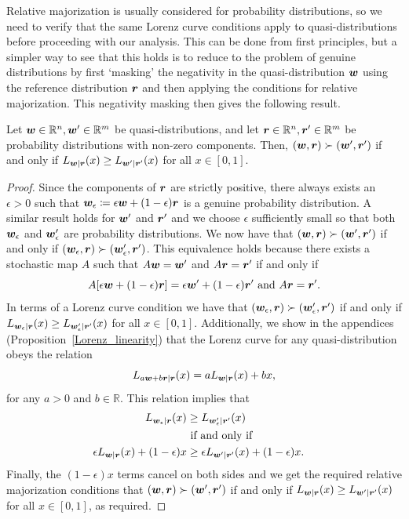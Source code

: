 \documentclass[pra,
aps,
twocolumn,
superscriptaddress,
groupedaddress,
nofootinbib,
reprint
]{revtex4-1}
\begin{document}
Relative majorization is usually considered for probability distributions, so we need to verify that the same Lorenz curve conditions apply to quasi-distributions before proceeding with our analysis. This can be done from first principles, but a simpler way to see that this holds is to reduce to the problem of genuine distributions by first `masking' the negativity in the quasi-distribution $\boldsymbol{w}$ using the reference distribution $\boldsymbol{r}$ and then applying the conditions for relative majorization. This negativity masking then gives the following result.

\begin{theorem}\label{thm:lcquasi}
	Let $\boldsymbol{w} \in \mathbb{R}^n,\boldsymbol{w}'\in \mathbb{R}^m$ be quasi-distributions, and let $\boldsymbol{r} \in \mathbb{R}^n, \boldsymbol{r}' \in \mathbb{R}^m$ be probability distributions with non-zero components. Then, $(\boldsymbol{w}, \boldsymbol{r}) \succ (\boldsymbol{w}', \boldsymbol{r}')$ if and only if $L_{\boldsymbol{w}|\boldsymbol{r}}(x) \ge L_{\boldsymbol{w}' |\boldsymbol{r}'}(x)$ for all $x \in [0,1]$.
\end{theorem}
\begin{proof}
	Since the components of $\boldsymbol{r}$ are strictly positive, there always exists an $\epsilon >0$ such that $\boldsymbol{w}_\epsilon \coloneqq \epsilon \boldsymbol{w} + (1-\epsilon) \boldsymbol{r}$ is a genuine probability distribution. A similar result holds for $\boldsymbol{w}'$ and $\boldsymbol{r}'$ and we choose $\epsilon$ sufficiently small so that both $\boldsymbol{w}_\epsilon$ and $\boldsymbol{w}_\epsilon'$ are probability distributions. We now have that $(\boldsymbol{w}, \boldsymbol{r}) \succ (\boldsymbol{w}', \boldsymbol{r}')$ if and only if $(\boldsymbol{w}_\epsilon , \boldsymbol{r}) \succ (\boldsymbol{w}_\epsilon', \boldsymbol{r}')$. This equivalence holds because there exists a stochastic map $A$ such that $A \boldsymbol{w} = \boldsymbol{w}'$ and $A \boldsymbol{r} = \boldsymbol{r}'$ if and only if 
\begin{equation}
A[\epsilon \boldsymbol{w} + (1-\epsilon) \boldsymbol{r}] = \epsilon \boldsymbol{w}' + (1-\epsilon) \boldsymbol{r}'\mbox{ and } A\boldsymbol{r} = \boldsymbol{r}'.
\end{equation}
In terms of a Lorenz curve condition we have that $(\boldsymbol{w}_\epsilon , \boldsymbol{r}) \succ (\boldsymbol{w}_\epsilon', \boldsymbol{r}')$ if and only if $L_{\boldsymbol{w}_\epsilon |\boldsymbol{r}} (x) \ge L_{\boldsymbol{w}'_\epsilon |\boldsymbol{r}'} (x)$ for all $x \in [0,1]$. 
Additionally, we show in the appendices (Proposition~\ref{Lorenz_linearity}) that the Lorenz curve for any quasi-distribution obeys the relation
\begin{equation}
L_{a \boldsymbol{w} + b \boldsymbol{r} | \boldsymbol{r}} (x) = a L_{\boldsymbol{w}|\boldsymbol{r}} (x) + bx,
\end{equation}
for any $a >0$ and $b \in \mathbb{R}$. This relation implies that
\begin{align*}
L_{\boldsymbol{w}_\epsilon |\boldsymbol{r}} (x) &\ge L_{\boldsymbol{w}'_\epsilon |\boldsymbol{r}'} (x) \nonumber \\ 
&\mbox{ if and only if }& \\
\epsilon L_{\boldsymbol{w} |\boldsymbol{r}} (x) + (1-\epsilon) x &\ge \epsilon L_{\boldsymbol{w}' |\boldsymbol{r}'} (x) + (1-\epsilon) x.
\end{align*}
Finally, the $(1-\epsilon)x$ terms cancel on both sides and we get the required relative majorization conditions that $(\boldsymbol{w}, \boldsymbol{r}) \succ (\boldsymbol{w}', \boldsymbol{r}')$ if and only if $L_{\boldsymbol{w} | \boldsymbol{r}} (x) \ge L_{\boldsymbol{w}' | \boldsymbol{r}'}(x)$ for all $x \in [0,1]$, as required.
\end{proof}
\end{document}

